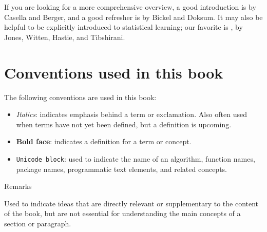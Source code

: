 If you are looking for a more comprehensive overview, a good introduction is \citep{Casella2001Jun} by Casella and Berger, and a good refresher is \cite{Bickel2006May} by Bickel and Doksum. It may also be helpful to be explicitly introduced to statistical learning; our favorite is \citep{James2021Jul}, by Jones, Witten, Hastie, and Tibshirani.

\section*{Conventions used in this book}

The following conventions are used in this book:

\begin{itemize}
    \item \emph{Italics}: indicates emphasis behind a term or exclamation. Also often used when terms have not yet been defined, but a definition is upcoming.
    \item \textbf{Bold face}: indicates a definition for a term or concept.
    \item \texttt{Unicode block}: used to indicate the name of an algorithm, function names, package names, programmatic text elements, and related concepts.
\end{itemize}

\begin{floatingbox}[h]
\caption{Remarks}
Used to indicate ideas that are directly relevant or supplementary to the content of the book, but are not essential for understanding the main concepts of a section or paragraph.
\label{fb}
\end{floatingbox}

